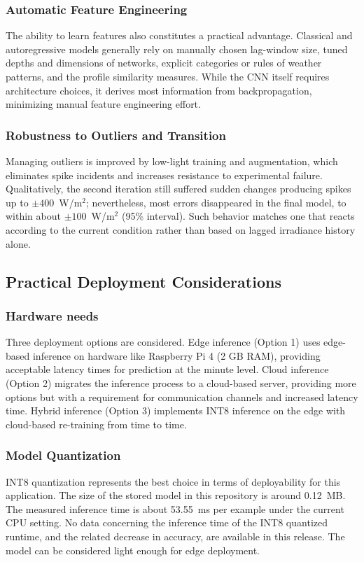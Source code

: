 \documentclass[journal]{IEEEtran}
\begin{document}
\subsubsection{Automatic Feature Engineering}
The ability to learn features also constitutes a practical advantage. Classical and autoregressive models generally rely on manually chosen lag-window size, tuned depths and dimensions of networks, explicit categories or rules of weather patterns, and the profile similarity measures. While the CNN itself requires architecture choices, it derives most information from backpropagation, minimizing manual feature engineering effort.

\subsubsection{Robustness to Outliers and Transition}
Managing outliers is improved by low-light training and augmentation, which eliminates spike incidents and increases resistance to experimental failure. Qualitatively, the second iteration still suffered sudden changes producing spikes up to $\pm400$~W/m$^2$; nevertheless, most errors disappeared in the final model, to within about $\pm100$~W/m$^2$ (95\% interval). Such behavior matches one that reacts according to the current condition rather than based on lagged irradiance history alone.

\subsection{Practical Deployment Considerations}

\subsubsection{Hardware needs}
Three deployment options are considered. Edge inference (Option 1) uses edge-based inference on hardware like Raspberry Pi 4 (2 GB RAM), providing acceptable latency times for prediction at the minute level. Cloud inference (Option 2) migrates the inference process to a cloud-based server, providing more options but with a requirement for communication channels and increased latency time. Hybrid inference (Option 3) implements INT8 inference on the edge with cloud-based re-training from time to time.
\subsubsection{Model Quantization}
INT8 quantization represents the best choice in terms of deployability for this application. The size of the stored model in this repository is around 0.12~MB. The measured inference time is about 53.55~ms per example under the current CPU setting. No data concerning the inference time of the INT8 quantized runtime, and the related decrease in accuracy, are available in this release. The model can be considered light enough for edge deployment.
\end{document}
